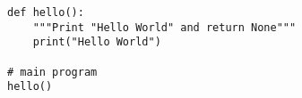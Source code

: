 \begin{lstlisting}[style=python-idle-code,caption={[Darstellung mit Stiloption \enquote{python-idle-code}.]Standard-Darstellung mit Stiloption \enquote{python-idle-code}. Die Darstellung lehnt sich an die Farbgebung der IDE \enquote{IDLE} an. Eine solche farbige Darstellung kann die Übersicht erleichtern, ist aber für überwiegend nicht farbig gedruckte Texte nicht immer optimal. Die zusätzlichen Zeilennummern lassen sich bei Bedarf natürlich ausschalten.}]
def hello():
    """Print "Hello World" and return None"""
    print("Hello World")

# main program
hello()
\end{lstlisting}
